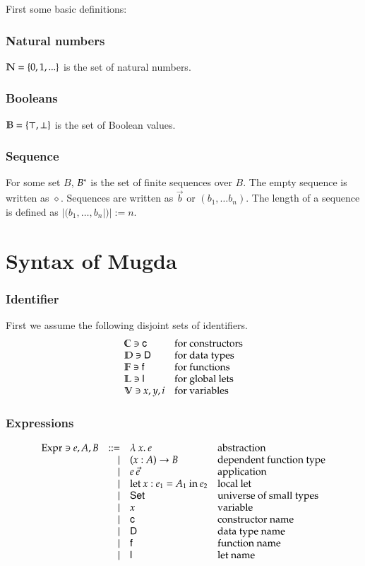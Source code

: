 \noindent First some basic definitions:
\subsubsection{Natural numbers}
$ \mathbb{N} = \{ 0 , 1 , ... \} $ is the set of natural numbers.
\subsubsection{Booleans}
$ \mathbb{B} = \{ \top, \bot \} $ is the set of Boolean values.
\subsubsection{Sequence}
For some set $B$, ${B}^{\ast}$ is the set of finite sequences over $B$.
The empty sequence is written as $\diamond$.
Sequences are written as $\vec{b}$ or $(b_1, \ldots b_n)$.
The length of a sequence is defined as $|(b_1,\ldots, b_n|)| := n $. 
\section{Syntax of Mugda}

\subsubsection{Identifier}
First we assume the following disjoint sets of identifiers.
\[
\begin{array}{ll}
\mathbb{C} \ni \mathsf{c} & \mbox{for constructors}\\
\mathbb{D} \ni \mathsf{D} & \mbox{for data types}\\
\mathbb{F} \ni \mathsf{f} & \mbox{for functions}\\
\mathbb{L} \ni \mathsf{l} & \mbox{for global lets}\\
\mathbb{V} \ni x,y,i & \mbox{for variables}
\end{array}
\]

\subsubsection{Expressions}
\[
\begin{array}{lrll}
\mathrm{Expr} \ni e,A,B & ::= & \lambda\: x .\:{e} & \mbox{abstraction}\\
& \mid & ( x : A ) \rightarrow{B} & \mbox{dependent function type}\\
& \mid & e \: \vec{e} & \mbox{application}\\
& \mid & \mathrm{let}\: x : e_1 = A_1 \: \mathrm{in}\:{e_2} & \mbox{local let}\\ 
& \mid & \mathsf{Set} & \mbox{universe of small types}\\
& \mid & x & \mbox{variable}\\
& \mid & \mathsf{c} & \mbox{constructor name}\\
& \mid & \mathsf{D} & \mbox{data type name}\\
& \mid & \mathsf{f} & \mbox{function name}\\
& \mid & \mathsf{l} & \mbox{let name}
\end{array}
\]

